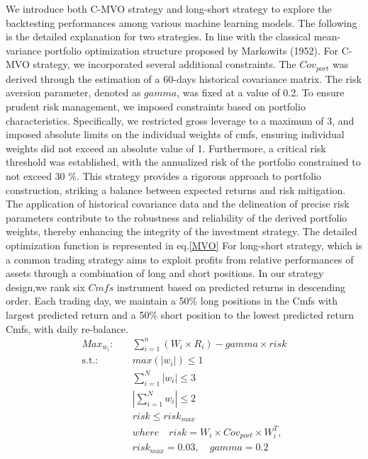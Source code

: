 \documentclass[10pt,letterpaper]{article}
\begin{document}
We introduce both C-MVO strategy and long-short strategy to explore the backtesting performances among various machine learning models. The following is the detailed explanation for two strategies.  In line with the classical mean-variance portfolio optimization structure proposed by Markowits (1952).  For C-MVO strategy, we incorporated several additional constraints. The \(Cov_{port}\) was derived through the estimation of a 60-days historical covariance matrix. The risk aversion parameter, denoted as \(gamma\), was fixed at a value of 0.2. To ensure prudent risk management, we imposed constraints based on portfolio characteristics. Specifically, we restricted gross leverage to a maximum of 3, and imposed absolute limits on the individual weights of cmfs, ensuring individual weights did not exceed an absolute value of 1. Furthermore, a critical risk threshold was established, with the annualized risk of the portfolio constrained to not exceed 30 \%.
This strategy provides a rigorous approach to portfolio construction, striking a balance between expected returns and risk mitigation. The application of historical covariance data and the delineation of precise risk parameters contribute to the robustness and reliability of the derived portfolio weights, thereby enhancing the integrity of the investment strategy. The detailed optimization function is represented in eq.\ref{MVO}
 For long-short strategy, which is a common trading strategy aims to exploit profits from relative performances of assets through a combination of long and short positions. In our strategy design,we rank six \(Cmfs\) instrument based on predicted returns in descending order.  Each trading day, we maintain a 50\% long positions in the Cmfs with largest predicted return and a 50\% short position to the lowest predicted return Cmfs, with daily re-balance.
\begin{eqnarray}
\label{MVO}
    Max_{w_i}: \quad & \sum_{i=1}^{n} (W_i \times R_i)-gamma \times risk \nonumber \\
\text{s.t.:} \quad & max(|w_i|) \leq 1 \nonumber \\
                         & \sum_{i=1}^{N} |w_i| \leq 3 \\
        & \left| \sum_{i=1}^{N} w_i \right| \leq 2 \nonumber \\
        & risk \leq risk_{max} \nonumber \\
        & where \quad risk=W_i \times Cov_{port} \times W_{i}^T, \nonumber \\
        & risk_{max}=0.03, \quad gamma=0.2 \nonumber
\end{eqnarray}
\end{document}
